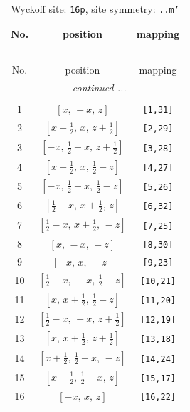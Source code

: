 \documentclass[fleqn,8pt]{jsarticle}
\begin{document}
\renewcommand{\arraystretch}{1.2}
\begin{longtable}{ccc}
\caption{Wyckoff site: {\tt 16p}, site symmetry: {\tt ..m'}}
 \\
 \hline \hline
No. & position & mapping \\ \hline \endfirsthead

\multicolumn{2}{l}{\tablename\ \thetable{}} \\
 \hline \hline
No. & position & mapping \\ \hline \endhead

 \hline \hline
\multicolumn{2}{r}{\footnotesize\it continued ...} \\ \endfoot

 \hline \hline
\multicolumn{2}{r}{} \\ \endlastfoot

1 & $\left[ x,\, - x,\, z \right]$ & {\tt [1,31]} \\ \hline
2 & $\left[ x + \frac{1}{2},\, x,\, z + \frac{1}{2} \right]$ & {\tt [2,29]} \\ \hline
3 & $\left[ - x,\, \frac{1}{2} - x,\, z + \frac{1}{2} \right]$ & {\tt [3,28]} \\ \hline
4 & $\left[ x + \frac{1}{2},\, x,\, \frac{1}{2} - z \right]$ & {\tt [4,27]} \\ \hline
5 & $\left[ - x,\, \frac{1}{2} - x,\, \frac{1}{2} - z \right]$ & {\tt [5,26]} \\ \hline
6 & $\left[ \frac{1}{2} - x,\, x + \frac{1}{2},\, z \right]$ & {\tt [6,32]} \\ \hline
7 & $\left[ \frac{1}{2} - x,\, x + \frac{1}{2},\, - z \right]$ & {\tt [7,25]} \\ \hline
8 & $\left[ x,\, - x,\, - z \right]$ & {\tt [8,30]} \\ \hline
9 & $\left[ - x,\, x,\, - z \right]$ & {\tt [9,23]} \\ \hline
10 & $\left[ \frac{1}{2} - x,\, - x,\, \frac{1}{2} - z \right]$ & {\tt [10,21]} \\ \hline
11 & $\left[ x,\, x + \frac{1}{2},\, \frac{1}{2} - z \right]$ & {\tt [11,20]} \\ \hline
12 & $\left[ \frac{1}{2} - x,\, - x,\, z + \frac{1}{2} \right]$ & {\tt [12,19]} \\ \hline
13 & $\left[ x,\, x + \frac{1}{2},\, z + \frac{1}{2} \right]$ & {\tt [13,18]} \\ \hline
14 & $\left[ x + \frac{1}{2},\, \frac{1}{2} - x,\, - z \right]$ & {\tt [14,24]} \\ \hline
15 & $\left[ x + \frac{1}{2},\, \frac{1}{2} - x,\, z \right]$ & {\tt [15,17]} \\ \hline
16 & $\left[ - x,\, x,\, z \right]$ & {\tt [16,22]} \\
\end{longtable}
\end{document}
